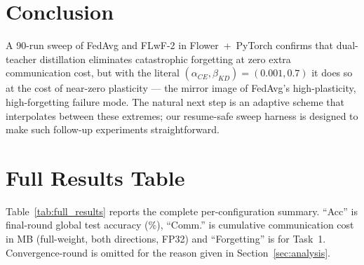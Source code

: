 \documentclass[journal]{IEEEtran}
\begin{document}
\section{Conclusion}
\label{sec:conclusion}

A 90-run sweep of FedAvg and FLwF-2 in Flower~+~PyTorch confirms that
dual-teacher distillation eliminates catastrophic forgetting at zero
extra communication cost, but with the literal
$(\alpha_{CE},\beta_{KD})=(0.001,0.7)$ it does so at the cost of
near-zero plasticity --- the mirror image of FedAvg's high-plasticity,
high-forgetting failure mode. The natural next step is an adaptive
scheme that interpolates between these extremes; our resume-safe
sweep harness is designed to make such follow-up experiments
straightforward.

\appendix
\section{Full Results Table}
\label{app:results}

Table~\ref{tab:full_results} reports the complete per-configuration
summary. ``Acc'' is final-round global test accuracy ($\%$),
``Comm.'' is cumulative communication cost in MB (full-weight, both
directions, FP32) and ``Forgetting'' is for Task~1. Convergence-round
is omitted for the reason given in Section~\ref{sec:analysis}.


\end{document}
